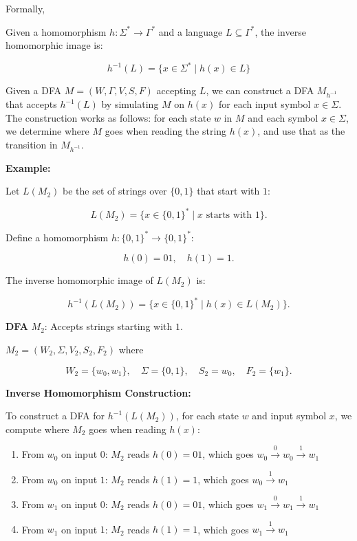 \documentclass[12pt,a4paper,openany]{article}
\begin{document}
Formally,

Given a homomorphism $h: \Sigma^* \to \Gamma^*$ and a language $L \subseteq \Gamma^*$, the inverse homomorphic image is:

\[h^{-1}(L) = \{ x \in \Sigma^* \mid h(x) \in L \}\]

Given a DFA $M = (W, \Gamma, V, S, F)$ accepting $L$, we can construct a DFA $M_{h^{-1}}$ that accepts $h^{-1}(L)$ by simulating $M$ on $h(x)$ for each input symbol $x \in \Sigma$.
The construction works as follows: for each state $w$ in $M$ and each symbol $x \in \Sigma$, we determine where $M$ goes when reading the string $h(x)$, and use that as the transition in $M_{h^{-1}}$.

\textbf{Example:}

Let $L(M_2)$ be the set of strings over $\{0,1\}$ that start with $1$:

\[ L(M_2) = \{ x \in \{0,1\}^* \mid x \text{ starts with } 1 \}. \]

Define a homomorphism $h: \{0,1\}^* \to \{0,1\}^*$:

\[ h(0) = 01, \quad h(1) = 1. \]

The inverse homomorphic image of $L(M_2)$ is:

\[ h^{-1}(L(M_2)) = \{x \in \{0,1\}^* \mid h(x) \in L(M_2) \}. \]

\textbf{DFA} $M_2$: Accepts strings starting with $1$.

$M_2 = (W_2, \Sigma, V_2, S_2, F_2)$ where

\[ W_2 = \{w_0,w_1\}, \quad \Sigma = \{0,1\}, \quad S_2 = w_0, \quad F_2 = \{w_1\}. \]

\begin{center}
\end{center}

\textbf{Inverse Homomorphism Construction:}

To construct a DFA for $h^{-1}(L(M_2))$, for each state $w$ and input symbol $x$, we compute where $M_2$ goes when reading $h(x)$:

\begin{enumerate}
    \item From $w_0$ on input $0$: $M_2$ reads $h(0) = 01$, which goes $w_0 \xrightarrow{0} w_0 \xrightarrow{1} w_1$
    \item From $w_0$ on input $1$: $M_2$ reads $h(1) = 1$, which goes $w_0 \xrightarrow{1} w_1$
    \item From $w_1$ on input $0$: $M_2$ reads $h(0) = 01$, which goes $w_1 \xrightarrow{0} w_1 \xrightarrow{1} w_1$
    \item From $w_1$ on input $1$: $M_2$ reads $h(1) = 1$, which goes $w_1 \xrightarrow{1} w_1$
\end{enumerate}
\end{document}
